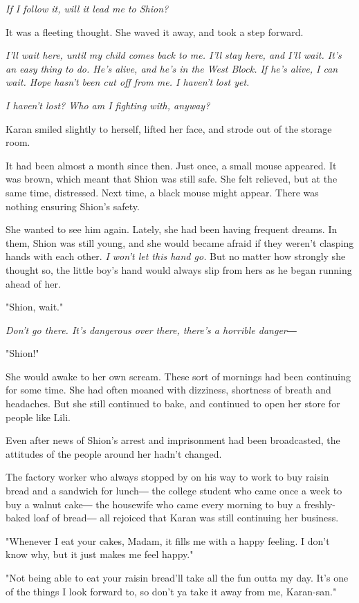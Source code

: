 \emph{If I follow it, will it lead me to Shion?}

It was a fleeting thought. She waved it away, and took a step forward.

\emph{I'll wait here, until my child comes back to me. I'll stay here, and
I'll wait. It's an easy thing to do. He's alive, and he's in the West
Block. If he's alive, I can wait. Hope hasn't been cut off from me. I
haven't lost yet.}

\emph{I haven't lost? Who am I fighting with, anyway?}

Karan smiled slightly to herself, lifted her face, and strode out of the
storage room.

It had been almost a month since then. Just once, a small mouse
appeared. It was brown, which meant that Shion was still safe. She felt
relieved, but at the same time, distressed. Next time, a black mouse
might appear. There was nothing ensuring Shion's safety.

She wanted to see him again. Lately, she had been having frequent
dreams. In them, Shion was still young, and she would became afraid if
they weren't clasping hands with each other. \emph{I won't let this hand go.}
But no matter how strongly she thought so, the little boy's hand would
always slip from hers as he began running ahead of her.

"Shion, wait."

\emph{Don't go there. It's dangerous over there, there's a horrible danger―}

"Shion!"

She would awake to her own scream. These sort of mornings had been
continuing for some time. She had often moaned with dizziness, shortness
of breath and headaches. But she still continued to bake, and continued
to open her store for people like Lili.

Even after news of Shion's arrest and imprisonment had been broadcasted,
the attitudes of the people around her hadn't changed.

The factory worker who always stopped by on his way to work to buy
raisin bread and a sandwich for lunch― the college student who came once
a week to buy a walnut cake― the housewife who came every morning to buy
a freshly-baked loaf of bread― all rejoiced that Karan was still
continuing her business.

"Whenever I eat your cakes, Madam, it fills me with a happy feeling. I
don't know why, but it just makes me feel happy."

"Not being able to eat your raisin bread'll take all the fun outta my
day. It's one of the things I look forward to, so don't ya take it away
from me, Karan-san."

